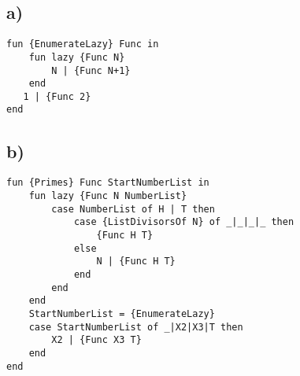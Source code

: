 \documentclass[11pt,a4paper]{report}
\begin{document}
\subsection{a)}
\begin{lstlisting}[language=Oz]
fun {EnumerateLazy} Func in
    fun lazy {Func N}
        N | {Func N+1}
    end
   1 | {Func 2}
end
\end{lstlisting}

\subsection{b)}
\begin{lstlisting}[language=Oz]
fun {Primes} Func StartNumberList in
    fun lazy {Func N NumberList}
        case NumberList of H | T then
            case {ListDivisorsOf N} of _|_|_|_ then
                {Func H T}
            else
                N | {Func H T}
            end
        end
    end
    StartNumberList = {EnumerateLazy}
    case StartNumberList of _|X2|X3|T then
        X2 | {Func X3 T}
    end
end
\end{lstlisting}


   
\end{document}
